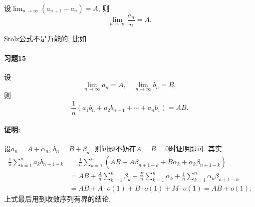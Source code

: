 设$\lim_{n\to\infty}(a_{n+1}-a_{n})=A$, 则
\[
\lim_{n\to\infty}\frac{a_{n}}{n}=A.
\]

Stolz公式不是万能的, 比如

\paragraph{习题15}

设
\[
\lim_{n\to\infty}a_{n}=A,\quad\lim_{n\to\infty}b_{n}=B,
\]
则
\[
\frac{1}{n}\left(a_{1}b_{n}+a_{2}b_{n-1}+\cdots+a_{n}b_{1}\right)=AB.
\]


\paragraph{证明:}

设$a_{n}=A+\alpha_{n}$, $b_{n}=B+\beta_{n}$, 则问题不妨在$A=B=0$时证明即可.
其实
\begin{align*}
\frac{1}{n}\sum_{k=1}^{n}a_{k}b_{n+1-k} & =\frac{1}{n}\sum_{k=1}^{n}\left(AB+A\beta_{n+1-k}+B\alpha_{k}+\alpha_{k}\beta_{n+1-k}\right)\\
 & =AB+\frac{A}{n}\sum_{k=1}^{n}\beta_{k}+\frac{B}{n}\sum_{k=1}^{n}\alpha_{k}+\frac{1}{n}\sum_{k=1}^{n}\alpha_{k}\beta_{n+1-k}\\
 & =AB+A\cdot o(1)+B\cdot o(1)+M\cdot o(1)=AB+o(1).
\end{align*}
上式最后用到收敛序列有界的结论.

\newpage
